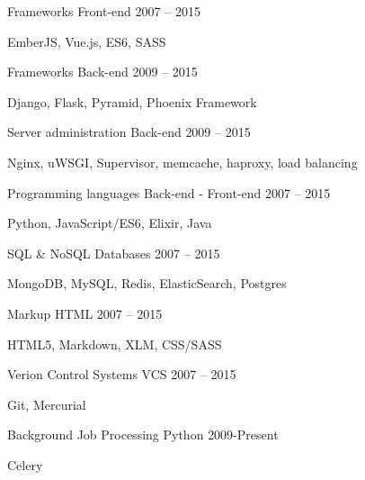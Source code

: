 \begin{cventries}
  \cventry
    {Frameworks}
    {Front-end}
    {}
    {2007 – 2015}
    {
      \begin{cvitems}
        \item {EmberJS, Vue.js, ES6, SASS}
      \end{cvitems}
    }
  \cventry
    {Frameworks}
    {Back-end}
    {}
    {2009 – 2015}
    {
      \begin{cvitems}
        \item {Django, Flask, Pyramid, Phoenix Framework}
      \end{cvitems}
    }
  \cventry
    {Server administration}
    {Back-end}
    {}
    {2009 – 2015}
    {
      \begin{cvitems}
        \item {Nginx, uWSGI, Supervisor, memcache, haproxy, load balancing}
      \end{cvitems}
    }
  \cventry
    {Programming languages}
    {Back-end - Front-end}
    {}
    {2007 – 2015}
    {
      \begin{cvitems}
        \item {Python, JavaScript/ES6, Elixir, Java}
      \end{cvitems}
    }
  \cventry
    {SQL \& NoSQL}
    {Databases}
    {}
    {2007 – 2015}
    {
      \begin{cvitems}
        \item {MongoDB, MySQL, Redis, ElasticSearch, Postgres}
      \end{cvitems}
    }
  \cventry
    {Markup}
    {HTML}
    {}
    {2007 – 2015}
    {
      \begin{cvitems}
        \item {HTML5, Markdown, XLM, CSS/SASS}
      \end{cvitems}
    }
  \cventry
    {Verion Control Systems}
    {VCS}
    {}
    {2007 – 2015}
    {
      \begin{cvitems}
        \item {Git, Mercurial}
      \end{cvitems}
    }
  \cventry
    {Background Job Processing}
    {Python}
    {}
    {2009-Present}
    {
      \begin{cvitems}
        \item {Celery}
      \end{cvitems}
    }
\end{cventries}
